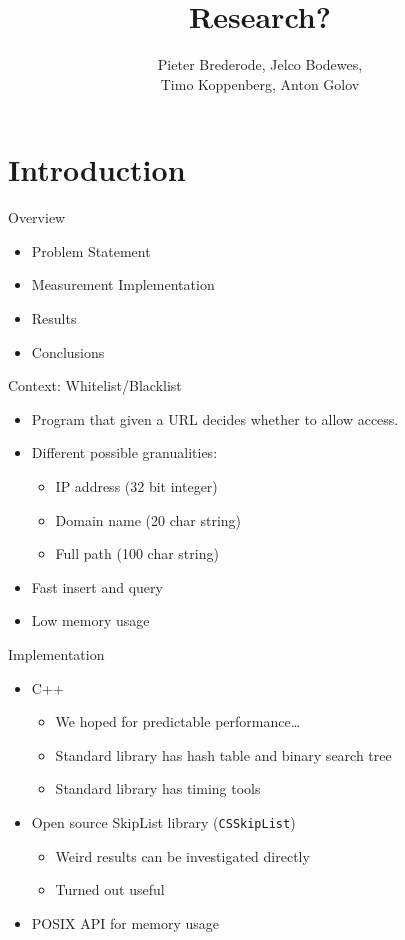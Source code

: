 \documentclass[10pt]{beamer}
\title{Research?}
\author{Pieter Brederode, Jelco Bodewes, \\ Timo Koppenberg, Anton Golov}
\institute{B3OMI}
\begin{document}
\begin{frame}
    \maketitle
\end{frame}


\section{Introduction}
\begin{frame}{Overview}
    \begin{itemize}
        \item Problem Statement
        \item Measurement Implementation
        \item Results
        \item Conclusions
    \end{itemize}
\end{frame}

\begin{frame}{Context: Whitelist/Blacklist}
    \begin{itemize}
        \item Program that given a URL decides whether to allow access.
        \item Different possible granualities:
        \begin{itemize}
            \item IP address (32 bit integer)
            \item Domain name (20 char string)
            \item Full path (100 char string)
        \end{itemize}
        \item Fast insert and query
        \item Low memory usage
    \end{itemize}
\end{frame}

\begin{frame}{Implementation}
    \begin{itemize}
        \item C++
        \begin{itemize}
            \item We hoped for predictable performance\ldots
            \item Standard library has hash table and binary search tree
            \item Standard library has timing tools
        \end{itemize}
        \item Open source SkipList library (\texttt{CSSkipList})
        \begin{itemize}
            \item Weird results can be investigated directly
            \item Turned out useful
        \end{itemize}
        \item POSIX API for memory usage
    \end{itemize}
\end{frame}
\end{document}

